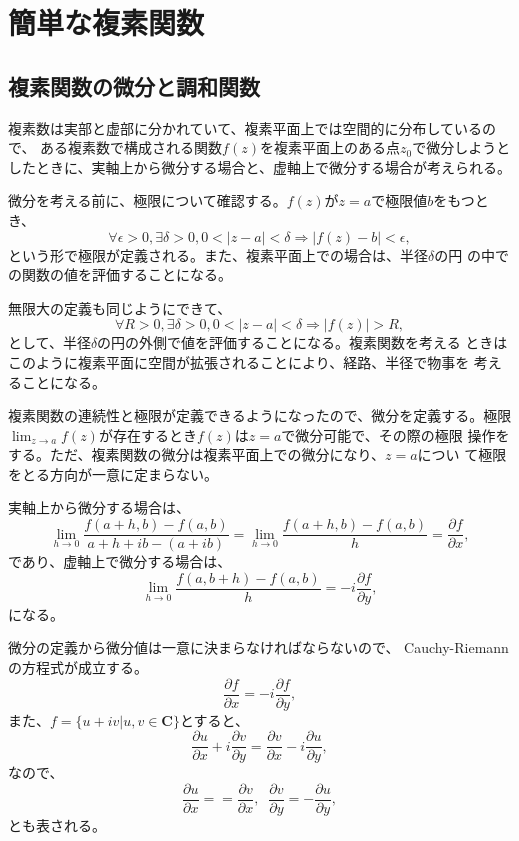 \chapter{簡単な複素関数}
\section{複素関数の微分と調和関数}
複素数は実部と虚部に分かれていて、複素平面上では空間的に分布しているので、
ある複素数で構成される関数$f(z)$を複素平面上のある点$z_0$で微分しようと
したときに、実軸上から微分する場合と、虚軸上で微分する場合が考えられる。

微分を考える前に、極限について確認する。$f(z)$が$z=a$で極限値$b$をもつと
き、
\begin{equation}
 \forall \epsilon > 0, \exists \delta > 0, 0<|z-a|<\delta
  \Rightarrow |f(z)-b| < \epsilon,
\end{equation}
という形で極限が定義される。また、複素平面上での場合は、半径$\delta$の円
の中での関数の値を評価することになる。

無限大の定義も同じようにできて、
\begin{equation}
 \forall R > 0, \exists \delta > 0, 0<|z-a|<\delta
  \Rightarrow |f(z)| > R,
\end{equation}
として、半径$\delta$の円の外側で値を評価することになる。複素関数を考える
ときはこのように複素平面に空間が拡張されることにより、経路、半径で物事を
考えることになる。

複素関数の連続性と極限が定義できるようになったので、微分を定義する。極限
$\lim_{z\to a}f(z)$が存在するとき$f(z)$は$z=a$で微分可能で、その際の極限
操作をする。ただ、複素関数の微分は複素平面上での微分になり、$z=a$につい
て極限をとる方向が一意に定まらない。

実軸上から微分する場合は、
\begin{equation}
 \lim_{h\to 0} \frac{f(a+h,b) - f(a,b)}{a+h+ib - (a+ib)}
  = \lim_{h\to 0} \frac{f(a+h,b) - f(a,b)}{h} 
  = \frac{\partial f}{\partial x},
\end{equation}
であり、虚軸上で微分する場合は、
\begin{equation}
 \lim_{h\to 0} \frac{f(a,b+h) - f(a,b)}{h} 
  = -i\frac{\partial f}{\partial y},
\end{equation}
になる。

微分の定義から微分値は一意に決まらなければならないので、
Cauchy-Riemannの方程式が成立する。
\begin{equation}
 \frac{\partial f}{\partial x} = -i\frac{\partial f}{\partial y},
\end{equation}
また、$f=\{u+iv|u, v\in \mathbf{C}\}$とすると、
\[
 \frac{\partial u}{\partial x} + i\frac{\partial v}{\partial y}
 = \frac{\partial v}{\partial x} -i\frac{\partial u}{\partial y},
\]
なので、
\begin{equation}
  \frac{\partial u}{\partial x} = = \frac{\partial v}{\partial x},
  \mspace{10mu}
   \frac{\partial v}{\partial y} = -\frac{\partial u}{\partial y},
\end{equation}
とも表される。


